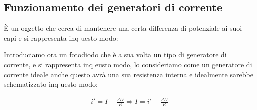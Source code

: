 \documentclass[a4paper, oneside]{article}
\newcommand{\E}{\mathcal{E}}
\begin{document}
\subsection{Funzionamento dei generatori di corrente}
È un oggetto che cerca di mantenere una certa differenza di potenziale ai suoi capi e si rappresenta inq uesto modo:
\begin{center}
\end{center}
Introduciamo ora un fotodiodo che è a sua volta un tipo di generatore di corrente, e si rappresenta inq eusto modo, lo consideriamo come un generatore di corrente ideale
anche questo avrà una sua resistenza interna e idealmente sarebbe schematizzato inq uesto modo:
\begin{center}
\end{center}
\begin{center}
    
\end{center}
\begin{gather*}
    i' = I - \frac{\Delta V}{R} \Rightarrow I = i' + \frac{\Delta V}{R}
\end{gather*}
\end{document}
